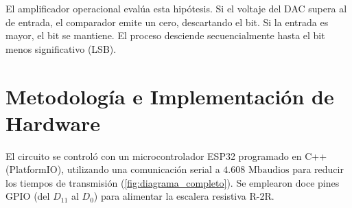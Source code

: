 \documentclass[conference]{IEEEtran}
\begin{document}
El amplificador operacional evalúa esta hipótesis. Si el voltaje del DAC supera al de entrada, el comparador emite un cero, descartando el bit. Si la entrada es mayor, el bit se mantiene. El proceso desciende secuencialmente hasta el bit menos significativo (LSB).

\section{Metodología e Implementación de Hardware}

El circuito se controló con un microcontrolador ESP32 programado en C++ (PlatformIO), utilizando una comunicación serial a $4.608\text{ Mbaudios}$ para reducir los tiempos de transmisión (\autoref{fig:diagrama_completo}). Se emplearon doce pines GPIO (del $D_{11}$ al $D_0$) para alimentar la escalera resistiva R-2R.
\end{document}

